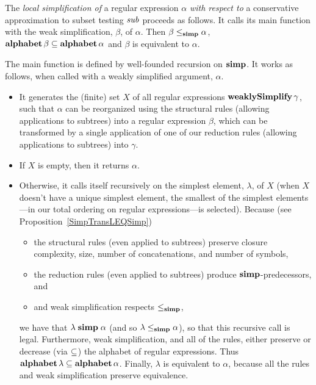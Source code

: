 The \emph{local simplification of} a regular expression $\alpha$
\emph{with respect to} a conservative approximation to subset testing
${\it sub}$ proceeds as follows.  It calls its main function with the weak
simplification, $\beta$, of $\alpha$. Then $\beta\mathrel{\leq_{\mathbf{simp}}}\alpha$,
$\mathbf{alphabet}\,\beta\subseteq\mathbf{alphabet}\,\alpha$ and $\beta$ is equivalent to
$\alpha$.

The main function is defined by well-founded recursion on $\mathrel{\mathbf{simp}}$.  It
works as follows, when called with a weakly simplified argument,
$\alpha$.
\begin{itemize}
\item It generates the (finite) set $X$ of all regular expressions
  $\mathbf{weaklySimplify}\,\gamma$, such that $\alpha$ can be reorganized
  using the structural rules (allowing applications to subtrees) into
  a regular expression $\beta$, which can be transformed by a single
  application of one of our reduction rules (allowing applications to
  subtrees) into $\gamma$.

\item If $X$ is empty, then it returns $\alpha$.

\item Otherwise, it calls itself recursively on the simplest element,
  $\lambda$, of $X$ (when $X$ doesn't have a unique simplest element,
  the smallest of the simplest elements---in our total ordering on
  regular expressions---is selected).  Because (see
  Proposition~\ref{SimpTransLEQSimp})
  \begin{itemize}
  \item the structural rules (even applied to subtrees) preserve
    closure complexity, size, number of concatenations, and number of
    symbols,

  \item the reduction rules (even applied to subtrees) produce
    $\mathrel{\mathbf{simp}}$-predecessors, and

  \item and weak simplification respects $\mathrel{\leq_{\mathbf{simp}}}$,
  \end{itemize}
  we have that $\lambda\mathrel{\mathbf{simp}}\alpha$ (and so $\lambda\mathrel{\leq_{\mathbf{simp}}}\alpha$),
  so that this recursive call is legal.  Furthermore, weak
  simplification, and all of the rules, either preserve or decrease
  (via $\subseteq$) the alphabet of regular expressions.  Thus
  $\mathbf{alphabet}\,\lambda\subseteq\mathbf{alphabet}\,\alpha$. Finally, $\lambda$ is
  equivalent to $\alpha$, because all the rules and weak simplification
  preserve equivalence.
\end{itemize}

